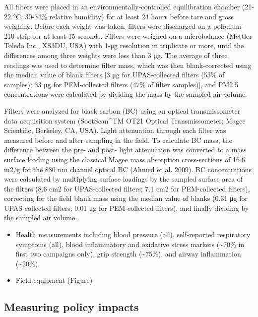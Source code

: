 \documentclass[
  letterpaper,
  DIV=11,
  numbers=noendperiod]{scrartcl}
\begin{document}
All filters were placed in an environmentally-controlled equilibration
chamber (21-22 °C, 30-34\% relative humidity) for at least 24 hours
before tare and gross weighing. Before each weight was taken, filters
were discharged on a polonium-210 strip for at least 15 seconds. Filters
were weighed on a microbalance (Mettler Toledo Inc., XS3DU, USA) with
1-μg resolution in triplicate or more, until the differences among three
weights were less than 3 μg. The average of three readings was used to
determine filter mass, which was then blank-corrected using the median
value of blank filters {[}3 μg for UPAS-collected filters (53\% of
samples); 33 μg for PEM-collected filters (47\% of filter samples){]},
and PM2.5 concentrations were calculated by dividing the mass by the
sampled air volume.

Filters were analyzed for black carbon (BC) using an optical
transmissometer data acquisition system (SootScan\^{}TM OT21 Optical
Transmissometer; Magee Scientific, Berkeley, CA, USA). Light attenuation
through each filter was measured before and after sampling in the field.
To calculate BC mass, the difference between the pre- and post- light
attenuation was converted to a mass surface loading using the classical
Magee mass absorption cross-sections of 16.6 m2/g for the 880 nm channel
optical BC (Ahmed et al. 2009). BC concentrations were calculated by
multiplying surface loadings by the sampled surface area of the filters
(8.6 cm2 for UPAS-collected filters; 7.1 cm2 for PEM-collected filters),
correcting for the field blank mass using the median value of blanks
(0.31 μg for UPAS-collected filters; 0.01 μg for PEM-collected filters),
and finally dividing by the sampled air volume.

\begin{itemize}
\item
  Health measurements including blood pressure (all), self-reported
  respiratory symptoms (all), blood inflammatory and oxidative stress
  markers (\textasciitilde70\% in first two campaigns only), grip
  strength (\textasciitilde75\%), and airway inflammation
  (\textasciitilde20\%).
\item
  Field equipment (Figure)
\end{itemize}

\subsection{Measuring policy impacts}\label{measuring-policy-impacts}
\end{document}
